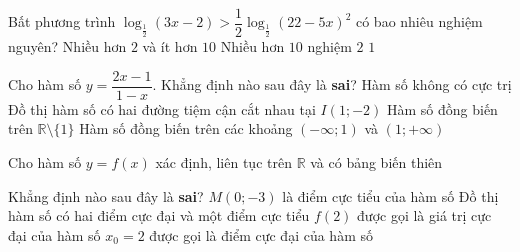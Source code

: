 \begin{ex}%
Bất phương trình $\log_{\tfrac{1}{2}}(3x-2)>\dfrac{1}{2}\log_{\tfrac{1}{2}}(22-5x)^2$ có bao nhiêu nghiệm nguyên?
\choice
{Nhiều hơn $2$ và ít hơn $10$}
{\True Nhiều hơn $10$ nghiệm}
{$2$}
{$1$}
\end{ex}

\begin{ex}%
Cho hàm số $y=\dfrac{2x-1}{1-x}$. Khẳng định nào sau đây là \textbf{sai}?
\choice
{Hàm số không có cực trị}
{Đồ thị hàm số có hai đường tiệm cận cắt nhau tại $I(1;-2)$}
{\True Hàm số đồng biến trên $\mathbb{R}\setminus \{1\}$}
{Hàm số đồng biến trên các khoảng $(-\infty;1)$ và $(1;+\infty)$}
\end{ex}

\begin{ex}%
Cho hàm số $y=f(x)$ xác định, liên tục trên $\mathbb{R}$ và có bảng biến thiên
\begin{center}
\end{center}
Khẳng định nào sau đây là \textbf{sai}?
\choice
{\True $M(0;-3)$ là điểm cực tiểu của hàm số}
{Đồ thị hàm số có hai điểm cực đại và một điểm cực tiểu}
{$f(2)$ được gọi là giá trị cực đại của hàm số}
{$x_0=2$ được gọi là điểm cực đại của hàm số}
\end{ex}

